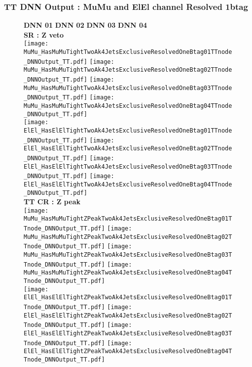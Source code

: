 \documentclass[9pt]{beamer}
\begin{document}
\begin{frame}
	\frametitle{TT DNN Output : MuMu and ElEl channel Resolved 1btag}
	\begin{figure}
	    \textbf{DNN 01} \hspace{1.2cm} \textbf{DNN 02} \hspace{1.2cm} \textbf{DNN 03} \hspace{1.2cm} \textbf{DNN 04} \\
        \centering
        \textbf{SR : Z veto} \\
		\texttt{[image: MuMu\_HasMuMuTightTwoAk4JetsExclusiveResolvedOneBtag01TTnode\_DNNOutput\_TT.pdf]}
		\texttt{[image: MuMu\_HasMuMuTightTwoAk4JetsExclusiveResolvedOneBtag02TTnode\_DNNOutput\_TT.pdf]}
		\texttt{[image: MuMu\_HasMuMuTightTwoAk4JetsExclusiveResolvedOneBtag03TTnode\_DNNOutput\_TT.pdf]}
		\texttt{[image: MuMu\_HasMuMuTightTwoAk4JetsExclusiveResolvedOneBtag04TTnode\_DNNOutput\_TT.pdf]}\\
		\texttt{[image: ElEl\_HasElElTightTwoAk4JetsExclusiveResolvedOneBtag01TTnode\_DNNOutput\_TT.pdf]}
		\texttt{[image: ElEl\_HasElElTightTwoAk4JetsExclusiveResolvedOneBtag02TTnode\_DNNOutput\_TT.pdf]}
		\texttt{[image: ElEl\_HasElElTightTwoAk4JetsExclusiveResolvedOneBtag03TTnode\_DNNOutput\_TT.pdf]}
		\texttt{[image: ElEl\_HasElElTightTwoAk4JetsExclusiveResolvedOneBtag04TTnode\_DNNOutput\_TT.pdf]}\\
        \textbf{TT CR : Z peak} \\
		\texttt{[image: MuMu\_HasMuMuTightZPeakTwoAk4JetsExclusiveResolvedOneBtag01TTnode\_DNNOutput\_TT.pdf]}
		\texttt{[image: MuMu\_HasMuMuTightZPeakTwoAk4JetsExclusiveResolvedOneBtag02TTnode\_DNNOutput\_TT.pdf]}
		\texttt{[image: MuMu\_HasMuMuTightZPeakTwoAk4JetsExclusiveResolvedOneBtag03TTnode\_DNNOutput\_TT.pdf]}
		\texttt{[image: MuMu\_HasMuMuTightZPeakTwoAk4JetsExclusiveResolvedOneBtag04TTnode\_DNNOutput\_TT.pdf]}\\
		\texttt{[image: ElEl\_HasElElTightZPeakTwoAk4JetsExclusiveResolvedOneBtag01TTnode\_DNNOutput\_TT.pdf]}
		\texttt{[image: ElEl\_HasElElTightZPeakTwoAk4JetsExclusiveResolvedOneBtag02TTnode\_DNNOutput\_TT.pdf]}
		\texttt{[image: ElEl\_HasElElTightZPeakTwoAk4JetsExclusiveResolvedOneBtag03TTnode\_DNNOutput\_TT.pdf]}
		\texttt{[image: ElEl\_HasElElTightZPeakTwoAk4JetsExclusiveResolvedOneBtag04TTnode\_DNNOutput\_TT.pdf]}\\
	\end{figure}
\end{frame}
\end{document}
